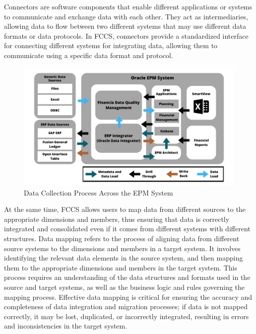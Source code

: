 \documentclass[12pt,a4paper,openright,twoside]{book}
\begin{document}
Connectors are software components that enable different applications or systems to communicate and exchange data with each other. 
%
They act as intermediaries, allowing data to flow between two different systems that may use different data formats or data protocols.
%
In FCCS, connectors provide a standardized interface for connecting different systems for integrating data, allowing them to communicate using a specific data format and protocol.

\begin{figure}[ht]
	\centering
	\includegraphics[width=\linewidth]{figures/data-load.pdf}
	\caption{Data Collection Process Across the EPM System}
	\label{fig:dataload}
\end{figure}

At the same time, FCCS allows users to map data from different sources to the appropriate dimensions and members, thus ensuring that data is correctly integrated and consolidated even if it comes from different systems with different structures.
%
Data mapping refers to the process of aligning data from different source systems to the dimensions and members in a target system.
%
It involves identifying the relevant data elements in the source system, and then mapping them to the appropriate dimensions and members in the target system. 
%
This process requires an understanding of the data structures and formats used in the source and target systems, as well as the business logic and rules governing the mapping process.
%
Effective data mapping is critical for ensuring the accuracy and completeness of data integration and migration processes; if data is not mapped correctly, it may be lost, duplicated, or incorrectly integrated, resulting in errors and inconsistencies in the target system. 
\end{document}
